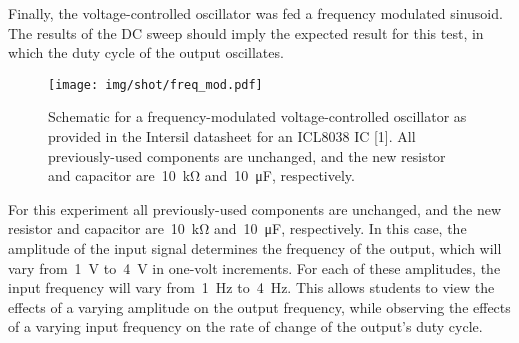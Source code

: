 Finally, the voltage-controlled oscillator was fed a frequency modulated
sinusoid.  The results of the DC sweep should imply the expected result for
this test, in which the duty cycle of the output oscillates.
%
\begin{figure}[H]
	\centering
	\texttt{[image: img/shot/freq\_mod.pdf]}
	\parbox{.6\textwidth}{
	\caption{Schematic for a frequency-modulated voltage-controlled oscillator
	as provided in the Intersil datasheet for an ICL8038 IC [1].  All
	previously-used components are unchanged, and the new resistor and
	capacitor are~\SI{10}{\kilo\ohm} and~\SI{10}{\micro\farad}, respectively.}
	\label{fig:freq_mod}}
\end{figure}
%
For this experiment all previously-used components are unchanged, and the new
resistor and capacitor are~\SI{10}{\kilo\ohm} and~\SI{10}{\micro\farad},
respectively.  In this case, the amplitude of the input signal determines the
frequency of the output, which will vary from~\SI{1}{\volt} to~\SI{4}{\volt} in
one-volt increments.  For each of these amplitudes, the input frequency will
vary from~\SI{1}{\hertz} to~\SI{4}{\hertz}.  This allows students to view the
effects of a varying amplitude on the output frequency, while observing the
effects of a varying input frequency on the rate of change of the output's duty
cycle.
